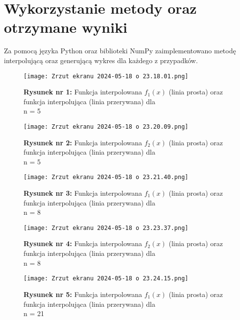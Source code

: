 \documentclass{article}
\begin{document}
\section{Wykorzystanie metody oraz otrzymane wyniki}
Za pomocą języka Python oraz biblioteki NumPy zaimplementowano metodę interpolującą oraz generującą wykres dla każdego z przypadków. 

\begin{figure}[H]
    \centering
    \texttt{[image: Zrzut ekranu 2024-05-18 o 23.18.01.png]}
    \caption{\textbf{Rysunek nr 1: }Funkcja interpolowana $f_1(x)$ (linia prosta) oraz funkcja interpolująca (linia przerywana) dla \\ n = 5}
    \label{fig:enter-label}
\end{figure}

\begin{figure}[H]
    \centering
    \texttt{[image: Zrzut ekranu 2024-05-18 o 23.20.09.png]}
    \caption{\textbf{Rysunek nr 2: }Funkcja interpolowana $f_2(x)$ (linia prosta) oraz funkcja interpolująca (linia przerywana) dla \\ n = 5}
    \label{fig:enter-label}
\end{figure}

\begin{figure}[H]
    \centering
    \texttt{[image: Zrzut ekranu 2024-05-18 o 23.21.40.png]}
    \caption{\textbf{Rysunek nr 3: }Funkcja interpolowana $f_1(x)$ (linia prosta) oraz funkcja interpolująca (linia przerywana) dla \\ n = 8}
    \label{fig:enter-label}
\end{figure}

\begin{figure}[H]
    \centering
    \texttt{[image: Zrzut ekranu 2024-05-18 o 23.23.37.png]}
    \caption{\textbf{Rysunek nr 4: }Funkcja interpolowana $f_2(x)$ (linia prosta) oraz funkcja interpolująca (linia przerywana) dla \\ n = 8}
    \label{fig:enter-label}
\end{figure}

\begin{figure}[h]
    \centering
    \texttt{[image: Zrzut ekranu 2024-05-18 o 23.24.15.png]}
    \caption{\textbf{Rysunek nr 5: }Funkcja interpolowana $f_1(x)$ (linia prosta) oraz funkcja interpolująca (linia przerywana) dla \\ n = 21}
    \label{fig:enter-label}
\end{figure}
\end{document}
